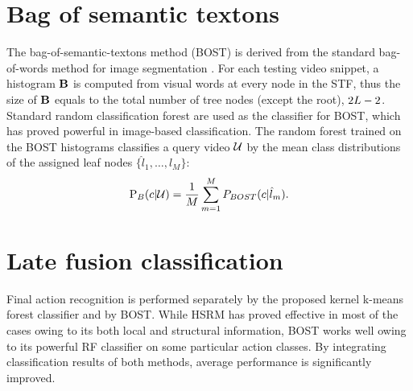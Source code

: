\section{Bag of semantic textons}
The bag-of-semantic-textons method (BOST) is derived from the standard bag-of-words method for image segmentation \cite{Shotton2008}. For each testing video snippet, a histogram $\mathbf{B}$ is computed from visual words at every node in the STF, thus the size of $\mathbf{B}$ equals to the total number of tree nodes (except the root), \ie $2L - 2$.  
Standard random classification forest \cite{Breiman2001} are used as the classifier for BOST, which has proved powerful in image-based classification. 
The random forest trained on the BOST histograms classifies a query video $\mathcal{U}$ by the mean class distributions of the assigned leaf nodes $\{\hat{l}_1,\dots,\hat{l}_{M}\}$:
\begin{equation}
\mathrm{P}_{B}(c|\mathcal{U}) = \frac{1}{M}\displaystyle\sum_{m=1}^{M}P_{BOST}(c|\hat{l}_m).
\label{eqn/act/bost}
\end{equation}

\section{Late fusion classification} 
Final action recognition is performed separately by the proposed kernel k-means forest classifier and by BOST. While HSRM has proved effective in most of the cases owing to its both local and structural information, BOST works well owing to its powerful RF classifier on some particular action classes. By integrating classification results of both methods, average performance is significantly improved. 

